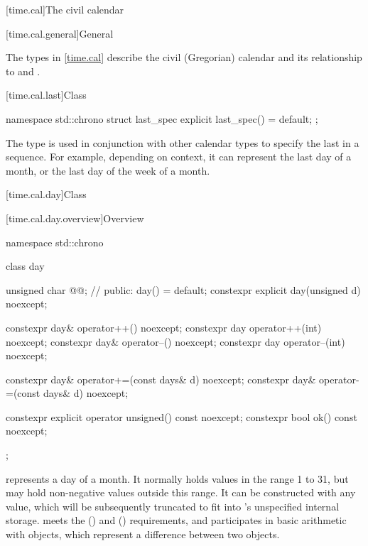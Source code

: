 [time.cal]{The civil calendar}

[time.cal.general]{General}

\pnum
The types in \ref{time.cal} describe the civil (Gregorian) calendar
and its relationship to  and .

[time.cal.last]{Class }
%

\begin{codeblock}
namespace std::chrono {
  struct last_spec {
    explicit last_spec() = default;
  };
}
\end{codeblock}

\pnum
The type  is used
in conjunction with other calendar types
to specify the last in a sequence.
For example, depending on context,
it can represent the last day of a month,
or the last day of the week of a month.

[time.cal.day]{Class }

[time.cal.day.overview]{Overview}

\begin{codeblock}
namespace std::chrono {
  class day {
    unsigned char @@;           // \expos
  public:
    day() = default;
    constexpr explicit day(unsigned d) noexcept;

    constexpr day& operator++()    noexcept;
    constexpr day  operator++(int) noexcept;
    constexpr day& operator--()    noexcept;
    constexpr day  operator--(int) noexcept;

    constexpr day& operator+=(const days& d) noexcept;
    constexpr day& operator-=(const days& d) noexcept;

    constexpr explicit operator unsigned() const noexcept;
    constexpr bool ok() const noexcept;
  };
}
\end{codeblock}

\pnum
{} represents a day of a month.
It normally holds values in the range 1 to 31,
but may hold non-negative values outside this range.
It can be constructed with any  value,
which will be subsequently truncated to fit into 's unspecified internal storage.
 meets the  ()
and  () requirements,
and participates in basic arithmetic with  objects,
which represent a difference between two  objects.

